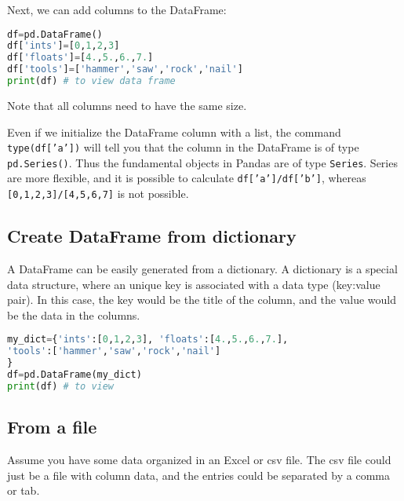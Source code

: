 \documentclass[graybox,sectrefs,envcountresetchap,open=right,final]{svmonodo}
\newenvironment{graybox2admon}[1][]{
\begin{graybox2mdframed}[frametitle=#1]
}
{
\end{graybox2mdframed}
}
\begin{document}
Next, we can add columns to the DataFrame:






\begin{lstlisting}[language=python,style=blue1bar]
df=pd.DataFrame()
df['ints']=[0,1,2,3]
df['floats']=[4.,5.,6.,7.]
df['tools']=['hammer','saw','rock','nail']
print(df) # to view data frame

\end{lstlisting}

Note that all columns need to have the same size.



\begin{graybox2admon}[\texttt{pd.Series()}]
Even if we initialize the DataFrame column with a list, the command \texttt{type(df['a'])} will tell you that the column in the DataFrame is of type \texttt{pd.Series()}. Thus the fundamental objects in Pandas are of type \texttt{Series}. Series are more flexible, and it is possible to calculate \texttt{df['a']/df['b']}, whereas \texttt{[0,1,2,3]/[4,5,6,7]} is not possible.
\end{graybox2admon}




\subsection{Create DataFrame from dictionary}
A DataFrame can be easily generated from a dictionary. A dictionary is a special data structure, where an unique key is associated with a data type (key:value pair). In this case, the key would be the title of the column, and the value would be the data in the columns.







\begin{lstlisting}[language=python,style=blue1bar]
my_dict={'ints':[0,1,2,3], 'floats':[4.,5.,6.,7.],
'tools':['hammer','saw','rock','nail']
}
df=pd.DataFrame(my_dict)
print(df) # to view

\end{lstlisting}


\subsection{From a file}
Assume you have some data organized in an Excel or csv file. The csv file could just be a file with column data, and the entries could be separated by a comma or tab.
\end{document}
